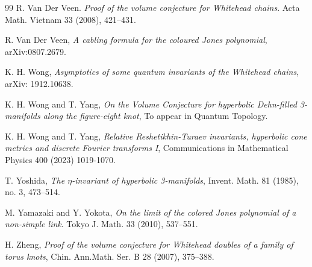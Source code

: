 \documentclass[12pt]{amsart}
\begin{document}
\begin{thebibliography}{99}
 R. Van Der Veen. {\em Proof of the volume conjecture for Whitehead chains}. Acta Math. Vietnam 33
(2008), 421–431.

 R. Van Der Veen, {\em A cabling formula for the coloured Jones polynomial}, arXiv:0807.2679.

 K. H. Wong, {\em Asymptotics of some quantum invariants of the Whitehead chains}, arXiv: 1912.10638.

 K. H. Wong and T. Yang, {\em On the Volume Conjecture for hyperbolic Dehn-filled 3-manifolds along
the figure-eight knot}, To appear in Quantum Topology.

 K. H. Wong and T. Yang, {\em Relative Reshetikhin-Turaev invariants, hyperbolic cone metrics and
discrete Fourier transforms I},  Communications in Mathematical Physics 400 (2023) 1019-1070.




 T. Yoshida, {\em The $\eta$-invariant of hyperbolic 3-manifolds}, Invent. Math. 81 (1985), no. 3, 473–514.

 M. Yamazaki and Y. Yokota, {\em On the limit of the colored Jones polynomial of a non-simple link}.
Tokyo J. Math. 33 (2010), 537–551.

 H. Zheng, {\em Proof of the volume conjecture for Whitehead doubles of a family of torus knots}, Chin.
Ann.Math. Ser. B 28 (2007), 375–388.

\end{thebibliography}
\end{document}
